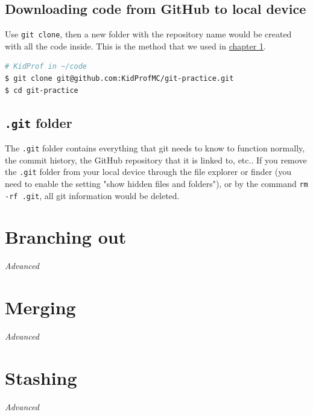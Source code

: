 \subsection{Downloading code from GitHub to local device}

Use \texttt{git clone}, then a new folder with the repository name would be created with all the code inside. This is the method that we used in \hyperref[sec:install7]{chapter 1}.

\begin{lstlisting}[language=bash]
# KidProf in ~/code
$ git clone git@github.com:KidProfMC/git-practice.git
$ cd git-practice
\end{lstlisting}

\subsection{\texttt{.git} folder}

The \texttt{.git} folder contains everything that git needs to know to function normally, the commit history, the GitHub repository that it is linked to, etc.. If you remove the \texttt{.git} folder from your local device through the file explorer or finder (you need to enable the setting "show hidden files and folders"), or by the command \texttt{rm -rf .git}, all git information would be deleted.

\section{Branching out}

\textit{Advanced}
\vspace{6mm}

\section{Merging}

\textit{Advanced}
\vspace{6mm}

\section{Stashing}

\textit{Advanced}
\vspace{6mm}

